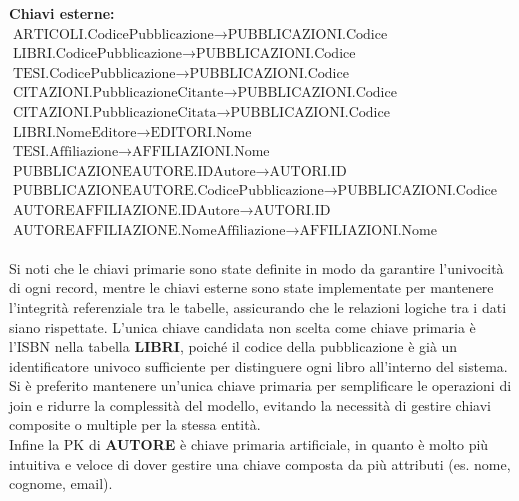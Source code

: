 \documentclass[a4paper,12pt]{article}
\begin{document}
\textbf{Chiavi esterne:} \\
$\text{ARTICOLI.CodicePubblicazione} \rightarrow \text{PUBBLICAZIONI.Codice}$ \\
$\text{LIBRI.CodicePubblicazione} \rightarrow \text{PUBBLICAZIONI.Codice}$ \\
$\text{TESI.CodicePubblicazione} \rightarrow \text{PUBBLICAZIONI.Codice}$ \\
$\text{CITAZIONI.PubblicazioneCitante} \rightarrow \text{PUBBLICAZIONI.Codice}$ \\
$\text{CITAZIONI.PubblicazioneCitata} \rightarrow \text{PUBBLICAZIONI.Codice}$ \\
$\text{LIBRI.NomeEditore} \rightarrow \text{EDITORI.Nome}$ \\
$\text{TESI.Affiliazione} \rightarrow \text{AFFILIAZIONI.Nome}$ \\
$\text{PUBBLICAZIONEAUTORE.IDAutore} \rightarrow \text{AUTORI.ID}$ \\
$\text{PUBBLICAZIONEAUTORE.CodicePubblicazione} \rightarrow \text{PUBBLICAZIONI.Codice}$ \\
$\text{AUTOREAFFILIAZIONE.IDAutore} \rightarrow \text{AUTORI.ID}$ \\
$\text{AUTOREAFFILIAZIONE.NomeAffiliazione} \rightarrow \text{AFFILIAZIONI.Nome}$ \\
\\
Si noti che le chiavi primarie sono state definite in modo da garantire l'univocità di ogni record, mentre le chiavi esterne sono state implementate per mantenere l'integrità referenziale tra le tabelle, assicurando che le relazioni logiche tra i dati siano rispettate. L'unica chiave candidata non scelta come chiave primaria è l'ISBN nella tabella \textbf{LIBRI}, poiché il codice della pubblicazione è già un identificatore univoco sufficiente per distinguere ogni libro all'interno del sistema. Si è preferito mantenere un'unica chiave primaria per semplificare le operazioni di join e ridurre la complessità del modello, evitando la necessità di gestire chiavi composite o multiple per la stessa entità. \\
Infine la PK di \textbf{AUTORE} è chiave primaria artificiale, in quanto è molto più intuitiva e veloce di dover gestire una chiave composta da più attributi (es. nome, cognome, email).
\end{document}
